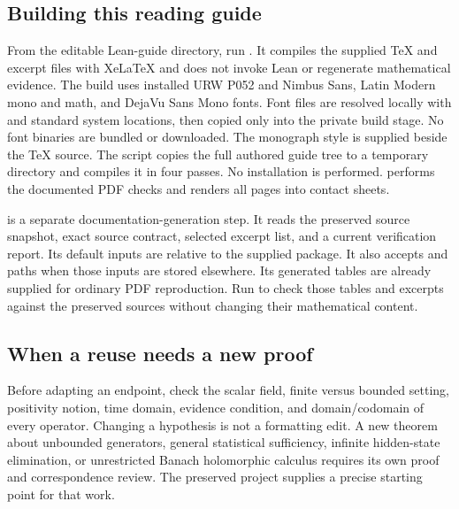 \subsection{Building this reading guide}
From the editable Lean-guide directory, run . It compiles the supplied TeX and excerpt files with XeLaTeX and does not invoke Lean or regenerate mathematical evidence. The build uses installed URW P052 and Nimbus Sans, Latin Modern mono and math, and DejaVu Sans Mono fonts. Font files are resolved locally with  and standard system locations, then copied only into the private build stage. No font binaries are bundled or downloaded. The monograph style is supplied beside the TeX source. The script copies the full authored guide tree to a temporary directory and compiles it in four passes. No installation is performed.  performs the documented PDF checks and renders all pages into contact sheets.

 is a separate documentation-generation step. It reads the preserved source snapshot, exact source contract, selected excerpt list, and a current verification report. Its default inputs are relative to the supplied package. It also accepts  and  paths when those inputs are stored elsewhere. Its generated tables are already supplied for ordinary PDF reproduction. Run  to check those tables and excerpts against the preserved sources without changing their mathematical content.

\subsection{When a reuse needs a new proof}
Before adapting an endpoint, check the scalar field, finite versus bounded setting, positivity notion, time domain, evidence condition, and domain/codomain of every operator. Changing a hypothesis is not a formatting edit. A new theorem about unbounded generators, general statistical sufficiency, infinite hidden-state elimination, or unrestricted Banach holomorphic calculus requires its own proof and correspondence review. The preserved project supplies a precise starting point for that work.
